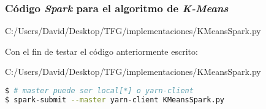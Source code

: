 \newpage

\subsubsection*{Código \textit{Spark} para el algoritmo de \textit{K-Means}}


                {C:/Users/David/Desktop/TFG/implementaciones/KMeansSpark.py}

\clearpage
Con el fin de testar el código anteriormente escrito:


                {C:/Users/David/Desktop/TFG/implementaciones/KMeansSpark.py}

\begin{lstlisting}[language=bash, numbers=none]
$ # master puede ser local[*] o yarn-client
$ spark-submit --master yarn-client KMeansSpark.py
\end{lstlisting}

                

\newpage